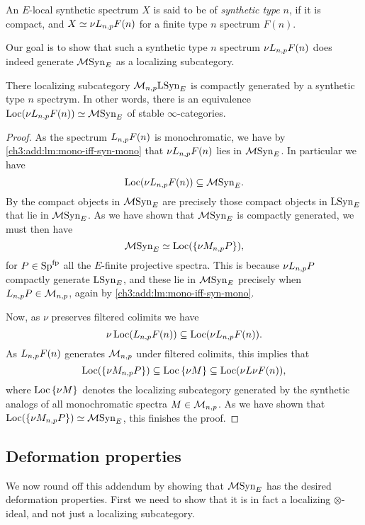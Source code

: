 \begin{definition}
    An $E$-local synthetic spectrum $X$ is said to be of \emph{synthetic type} $n$, if it is compact, and $X\simeq \nu L_{n,p} F(n)$ for a finite type $n$ spectrum $F(n)$. 
\end{definition}

Our goal is to show that such a synthetic type $n$ spectrum $\nu L_{n,p} F(n)$ does indeed generate $\mathcal{M}\mathrm{Syn}_{E}$ as a localizing subcategory. 

\begin{lemma}
    \label{ch3:add:monochromatic-synthetic-is-gen-by-type-n}
    There localizing subcategory $\mathcal{M}_{n,p}\mathrm{LSyn}_{E}$ is compactly generated by a synthetic type $n$ spectrym. In other words, there is an equivalence $\operatorname{Loc}(\nu L_{n,p} F(n))\simeq \mathcal{M}\mathrm{Syn}_{E}$ of stable $\infty$-categories. 
\end{lemma}
\begin{proof}
    As the spectrum $L_{n,p} F(n)$ is monochromatic, we have by \cref{ch3:add:lm:mono-iff-syn-mono} that $\nu L_{n,p} F(n)$ lies in $\mathcal{M}\mathrm{Syn}_{E}$. In particular we have 
    \[\operatorname{Loc}(\nu L_{n,p} F(n))\subseteq \mathcal{M}\mathrm{Syn}_{E}.\]
    By \cite[2.2]{neeman_1992} the compact objects in $\mathcal{M}\mathrm{Syn}_{E}$ are precisely those compact objects in $\mathrm{LSyn}_{E}$ that lie in $\mathcal{M}\mathrm{Syn}_{E}$. As we have shown that $\mathcal{M}\mathrm{Syn}_{E}$ is compactly generated, we must then have 
    \[\mathcal{M}\mathrm{Syn}_{E} \simeq \operatorname{Loc}(\{\nu M_{n,p} P\}),\]
    for $P \in \mathrm{Sp}^{\mathrm{fp}}$ all the $E$-finite projective spectra. This is because $\nu L_{n,p} P$ compactly generate $\mathrm{LSyn}_{E}$, and these lie in $\mathcal{M}\mathrm{Syn}_{E}$ precisely when $L_{n,p} P\in \mathcal{M}_{n,p}$, again by \cref{ch3:add:lm:mono-iff-syn-mono}. 

    Now, as $\nu$ preserves filtered colimits we have 
    \[\nu \operatorname{Loc}(L_{n,p} F(n))\subseteq \operatorname{Loc}(\nu L_{n,p} F(n)).\]
    As $L_{n,p} F(n)$ generates $\mathcal{M}_{n,p}$ under filtered colimits, this implies that 
    \[\operatorname{Loc}(\{\nu M_{n,p} P\})\subseteq \operatorname{Loc}{\{\nu M\}} \subseteq \operatorname{Loc}(\nu L\nu F(n)),\]
    where $\operatorname{Loc}{\{\nu M\}}$ denotes the localizing subcategory generated by the synthetic analogs of all monochromatic spectra $M\in \mathcal{M}_{n,p}$. As we have shown that $\operatorname{Loc}(\{\nu M_{n,p} P\})\simeq \mathcal{M}\mathrm{Syn}_{E}$, this finishes the proof. 
\end{proof}



\subsection{Deformation properties}

We now round off this addendum by showing that $\mathcal{M}\mathrm{Syn}_{E}$ has the desired deformation properties. First we need to show that it is in fact a localizing $\otimes$-ideal, and not just a localizing subcategory. 

